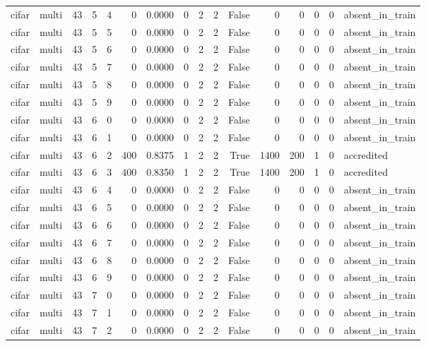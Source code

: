 \begin{tabular}{llrrrrrrrrrrrrrl}
cifar & multi & 43 & 5 & 4 & 0 & 0.0000 & 0 & 2 & 2 & False & 0 & 0 & 0 & 0 & absent\_in\_train \\
cifar & multi & 43 & 5 & 5 & 0 & 0.0000 & 0 & 2 & 2 & False & 0 & 0 & 0 & 0 & absent\_in\_train \\
cifar & multi & 43 & 5 & 6 & 0 & 0.0000 & 0 & 2 & 2 & False & 0 & 0 & 0 & 0 & absent\_in\_train \\
cifar & multi & 43 & 5 & 7 & 0 & 0.0000 & 0 & 2 & 2 & False & 0 & 0 & 0 & 0 & absent\_in\_train \\
cifar & multi & 43 & 5 & 8 & 0 & 0.0000 & 0 & 2 & 2 & False & 0 & 0 & 0 & 0 & absent\_in\_train \\
cifar & multi & 43 & 5 & 9 & 0 & 0.0000 & 0 & 2 & 2 & False & 0 & 0 & 0 & 0 & absent\_in\_train \\
cifar & multi & 43 & 6 & 0 & 0 & 0.0000 & 0 & 2 & 2 & False & 0 & 0 & 0 & 0 & absent\_in\_train \\
cifar & multi & 43 & 6 & 1 & 0 & 0.0000 & 0 & 2 & 2 & False & 0 & 0 & 0 & 0 & absent\_in\_train \\
cifar & multi & 43 & 6 & 2 & 400 & 0.8375 & 1 & 2 & 2 & True & 1400 & 200 & 1 & 0 & accredited \\
cifar & multi & 43 & 6 & 3 & 400 & 0.8350 & 1 & 2 & 2 & True & 1400 & 200 & 1 & 0 & accredited \\
cifar & multi & 43 & 6 & 4 & 0 & 0.0000 & 0 & 2 & 2 & False & 0 & 0 & 0 & 0 & absent\_in\_train \\
cifar & multi & 43 & 6 & 5 & 0 & 0.0000 & 0 & 2 & 2 & False & 0 & 0 & 0 & 0 & absent\_in\_train \\
cifar & multi & 43 & 6 & 6 & 0 & 0.0000 & 0 & 2 & 2 & False & 0 & 0 & 0 & 0 & absent\_in\_train \\
cifar & multi & 43 & 6 & 7 & 0 & 0.0000 & 0 & 2 & 2 & False & 0 & 0 & 0 & 0 & absent\_in\_train \\
cifar & multi & 43 & 6 & 8 & 0 & 0.0000 & 0 & 2 & 2 & False & 0 & 0 & 0 & 0 & absent\_in\_train \\
cifar & multi & 43 & 6 & 9 & 0 & 0.0000 & 0 & 2 & 2 & False & 0 & 0 & 0 & 0 & absent\_in\_train \\
cifar & multi & 43 & 7 & 0 & 0 & 0.0000 & 0 & 2 & 2 & False & 0 & 0 & 0 & 0 & absent\_in\_train \\
cifar & multi & 43 & 7 & 1 & 0 & 0.0000 & 0 & 2 & 2 & False & 0 & 0 & 0 & 0 & absent\_in\_train \\
cifar & multi & 43 & 7 & 2 & 0 & 0.0000 & 0 & 2 & 2 & False & 0 & 0 & 0 & 0 & absent\_in\_train \\

\end{tabular}
